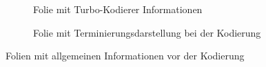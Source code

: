 \begin{figure}[th]
\centering
	\begin{subfigure}{0.45\textwidth}
	\centering
	\caption{Folie mit Turbo-Kodierer Informationen}
	\label{pic:TurboCoderInformation}
	\end{subfigure}
	\qquad
	\begin{subfigure}{0.45\textwidth}
	\centering
	\caption{Folie mit Terminierungsdarstellung bei der Kodierung}
	\label{pic:TerminationEncode}
	\end{subfigure} 
\caption{Folien mit allgemeinen Informationen vor der Kodierung}
\label{pic:SlidesCommonEncode}
\end{figure}  

